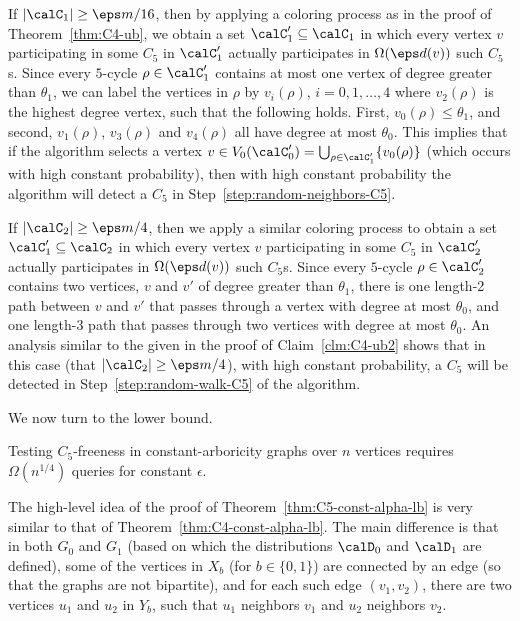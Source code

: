 If $|\calC_1|\geq \eps m/16$, then by applying a coloring process as in the proof of Theorem~\ref{thm:C4-ub}, we obtain a set $\calC'_1\subseteq \calC_1$
in which every vertex $v$ participating in some $C_5$ in $\calC'_1$ actually participates in  $\Omega(\eps d(v))$ such $C_5$s. Since every $5$-cycle $\rho\in \calC'_1$ contains at most one vertex of degree greater than $\theta_1$, we can label the vertices in $\rho$ by $v_i(\rho)$, $i=0,1,\dots,4$ where $v_2(\rho)$ is the highest degree vertex, such that the following holds. First, $v_0(\rho) \leq \theta_1$, and second, $v_1(\rho)$, $v_3(\rho)$ and $v_4(\rho)$ all have degree at most $\theta_0$. This implies that if the algorithm selects a vertex $v \in V_0(\calC_0') = \bigcup_{\rho\in \calC'_1} \{v_0(\rho)\}$ (which occurs with high constant probability), then with high constant probability the algorithm will detect a $C_5$ 
in Step~\ref{step:random-neighbors-C5}.

If $|\calC_2| \geq \eps m/4$, then we apply a similar coloring process to obtain a set $\calC'_1\subseteq \calC_2$
in which every vertex $v$ participating in some $C_5$ in $\calC'_2$ actually participates in  $\Omega(\eps d(v))$ such $C_5$s. Since every $5$-cycle $\rho\in \calC'_2$ contains two vertices, $v$ and $v'$ of degree greater than $\theta_1$, there is one length-2 path between $v$ and $v'$ that passes through a vertex with degree at most $\theta_0$, and one length-3 path that passes through two vertices with degree at most $\theta_0$. An analysis similar to the given in the proof of Claim~\ref{clm:C4-ub2} shows that in this case (that $|\calC_2| \geq \eps m/4$), with high constant probability, a $C_5$ will be detected in Step~\ref{step:random-walk-C5} of the algorithm.


\medskip\noindent
We now turn to the lower bound.
\begin{theorem} \label{thm:C5-const-alpha-lb}
Testing $C_5$-freeness in constant-arboricity graphs over $n$ vertices requires $\Omega(n^{1/4})$ queries for constant $\epsilon$.
\end{theorem}

The high-level idea of the proof of Theorem~\ref{thm:C5-const-alpha-lb} is very similar to that of Theorem~\ref{thm:C4-const-alpha-lb}. The main difference is that in both $G_0$ and $G_1$ (based on which the distributions $\calD_0$ and $\calD_1$ are defined), 
some of the vertices in $X_b$ (for $b\in \{0,1\}$) are connected by an edge (so that the graphs are not bipartite),
and for each such edge $(v_1,v_2)$, there are two vertices $u_1$ and $u_2$ in $Y_b$, such that $u_1$ neighbors $v_1$ and $u_2$ neighbors $v_2$.

